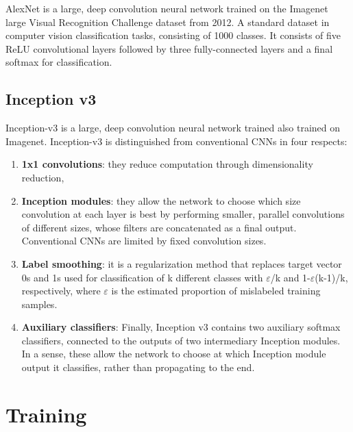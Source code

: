 AlexNet is a large, deep convolution neural network trained on the Imagenet large Visual Recognition Challenge dataset from 2012. A standard dataset in computer vision classification tasks, consisting of 1000 classes. It consists of five ReLU convolutional layers followed by three fully-connected layers and a final softmax for classification.

\subsection{Inception v3}

Inception-v3 is a large, deep convolution neural network trained also trained on Imagenet. Inception-v3 is distinguished from conventional CNNs in four respects: 
\begin{enumerate}
    \item \textbf{1x1 convolutions}: they reduce computation through dimensionality reduction,
    \item \textbf{Inception modules}: they allow the network to choose which size convolution at each layer is best by performing smaller, parallel convolutions of different sizes, whose filters are concatenated as a final output. Conventional CNNs are limited by fixed convolution sizes.
    \item \textbf{Label smoothing}: it is a regularization method that replaces target vector 0s and 1s used for classification of k different classes with $\varepsilon$/k and 1-$\varepsilon$(k-1)/k, respectively, where $\varepsilon$ is the estimated proportion of mislabeled training samples.
    \item \textbf{Auxiliary classifiers}: Finally, Inception v3 contains two auxiliary softmax classifiers, connected to the outputs of two intermediary Inception modules. In a sense, these allow the network to choose at which Inception module output it classifies, rather than propagating to the end.

\end{enumerate}

\section{Training}

